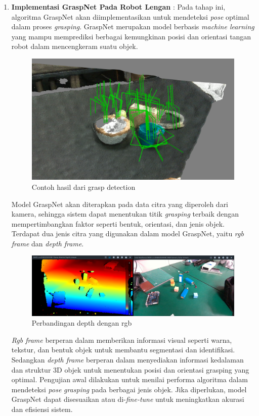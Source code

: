 \begin{enumerate}
  \item \textbf{Implementasi GraspNet Pada Robot Lengan} : Pada tahap ini, algoritma GraspNet
  akan diimplementasikan untuk mendeteksi \emph{pose} optimal dalam proses \emph{grasping}.
  GraspNet merupakan model berbasis \emph{machine learning} yang mampu memprediksi berbagai
  kemungkinan posisi dan orientasi tangan robot dalam mencengkeram suatu objek.
  \begin{figure} [H] \centering
    \includegraphics[scale=0.15]{gambar/contoh_hasil_graspdetect.png}
    \caption{Contoh hasil dari grasp detection\parencite{img_result_graspdetect}}
    \label{fig:graspdetect result}
  \end{figure}
  Model GraspNet akan diterapkan pada data citra yang diperoleh dari kamera, sehingga sistem dapat menentukan
  titik \emph{grasping} terbaik dengan mempertimbangkan faktor seperti bentuk, orientasi, dan jenis objek.
  Terdapat dua jenis citra yang digunakan dalam model GraspNet, yaitu \emph{rgb frame} dan \emph{depth frame}.
  \begin{figure} [H] \centering
    \includegraphics[scale=0.3]{gambar/depth_rgb.png}
    \caption{Perbandingan depth dengan rgb}
    \label{fig:depth_rgb}
  \end{figure}
  \emph{Rgb frame} berperan dalam memberikan informasi visual seperti warna, tekstur, dan bentuk objek
  untuk membantu segmentasi dan identifikasi. Sedangkan \emph{depth frame} berperan dalam menyediakan
  informasi kedalaman dan struktur 3D objek untuk menentukan posisi dan orientasi grasping yang optimal.
  Pengujian awal dilakukan untuk menilai performa algoritma dalam mendeteksi \emph{pose} \emph{grasping}
  pada berbagai jenis objek. Jika diperlukan, model GraspNet dapat disesuaikan atau
  di-\emph{fine-tune} untuk meningkatkan akurasi dan efisiensi sistem.
  

\end{enumerate}
